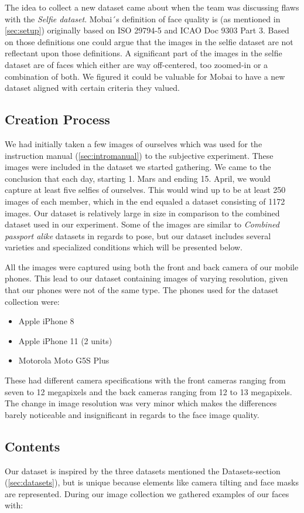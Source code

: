 The idea to collect a new dataset came about when the team was discussing flaws with the \textit{Selfie dataset}. Mobai´s definition of face quality is (as mentioned in \ref{sec:setup}) originally based on ISO 29794-5 and ICAO Doc 9303 Part 3. Based on those definitions one could argue that the images in the selfie dataset are not reflectant upon those definitions. A significant part of the images in the selfie dataset are of faces which either are way off-centered, too zoomed-in or a combination of both. We figured it could be valuable for Mobai to have a new dataset aligned with certain criteria they valued. 

\subsection*{Creation Process}
We had initially taken a few images of ourselves which was used for the instruction manual (\ref{sec:intromanual}) to the subjective experiment. These images were included in the dataset we started gathering. We came to the conclusion that each day, starting 1. Mars and ending 15. April, we would capture at least five selfies of ourselves. This would wind up to be at least 250 images of each member, which in the end equaled a dataset consisting of 1172 images. Our dataset is relatively large in size in comparison to the combined dataset used in our experiment. Some of the images are similar to \textit{Combined passport alike} datasets in regards to pose, but our dataset includes several varieties and specialized conditions which will be presented below. 

All the images were captured using both the front and back camera of our mobile phones. This lead to our dataset containing images of varying resolution, given that our phones were not of the same type. The phones used for the dataset collection were:
\begin{itemize}
    \item Apple iPhone 8 
    \item Apple iPhone 11 (2 units)
    \item Motorola Moto G5S Plus 
\end{itemize}
These had different camera specifications with the front cameras ranging from seven to 12 megapixels and the back cameras ranging from 12 to 13 megapixels. The change in image resolution was very minor which makes the differences barely noticeable and insignificant in regards to the face image quality.

\subsection*{Contents}
Our dataset is inspired by the three datasets mentioned the Datasets-section (\ref{sec:datasets}), but is unique because elements like camera tilting and face masks are represented. During our image collection we gathered examples of our faces with: 

